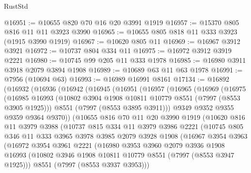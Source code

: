 \begin{lexlean}{RustStd}
\begin{coremodule}
{\begin{coremodule}
{{{{{{{{{{{{{{{{{{{{{{{{{{{{{{{{{{{{{{{{{{{@16951 := @10655 @820 @70 @16 @20 @3991 @1919
@16957 := @15370 @805 @816 @11 @11 @3923 @3990
@16965 := @10655 @805 @818 @11 @333 @3923 (@1915 @3990 @1919)
@16967 := @10620 @805 @11
@16969 := @16967 @3912 @3921
@16972 := @10737 @804 @334 @11
@16975 := @16972 @3912 @3919 @2221
@16980 := @10745 @99 @205 @11 @333 @1978
@16985 := @16980 @3911 @3918 @2079 @3894 @1908
@16989 := @10689 @63 @11 @63 @1978
@16991 := @7956 (@10694 @63)
@16993 := @16989 @16991 @8161
@17134 := @16892
    (@16932
      (@16936
        (@16942
          (@16945
            (@16951
              (@16957
                (@16965
                  (@16969
                    (@16975
                      (@16985
                        @16993
                        (@10802 @3904 @1908 @10811 @10779 @8551 (@7997 (@8553 @3905 @1925)))
                        @8551
                        (@7997 (@8553 @3895 @3911)))
                      @9349
                      @9352
                      @9355
                      @9359
                      @9364
                      @9370))
                  (@10655
                    @816
                    @70
                    @11
                    @20
                    @3990
                    @1919
                    (@10620
                      @816
                      @11
                      @3979
                      @3988
                      (@10737
                        @815
                        @334
                        @11
                        @3979
                        @3986
                        @2221
                        (@10745
                          @805
                          @346
                          @11
                          @333
                          @3965
                          @3978
                          @3985
                          @2079
                          @3928
                          @1908
                          (@16967
                            @3954
                            @3963
                            (@16972
                              @3954
                              @3961
                              @2221
                              (@16980
                                @3953
                                @3960
                                @2079
                                @3936
                                @1908
                                @16993
                                (@10802 @3946 @1908 @10811 @10779 @8551 (@7997 (@8553 @3947 @1925)))
                                @8551
                                (@7997 (@8553 @3937 @3953)))
}}}}}}}}}}}}}}}}}}}}}}}}}}}}}}}}}}}}}}}}}}}
\end{coremodule}}
\end{coremodule}
\end{lexlean}
